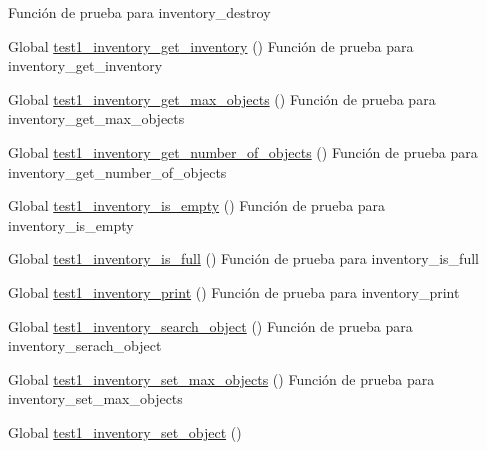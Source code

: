 \begin{DoxyRefList}
%
Función de prueba para inventory\+\_\+destroy  
\item[Global \mbox{\hyperlink{inventory__test_8c_a4fabef11aa72defe00459c078ae42af4}{test1\+\_\+inventory\+\_\+get\+\_\+inventory}} ()]\label{test__test000046}%
%
Función de prueba para inventory\+\_\+get\+\_\+inventory  
\item[Global \mbox{\hyperlink{inventory__test_8c_a17c5d7d6ecb4161696deca0155e13f4f}{test1\+\_\+inventory\+\_\+get\+\_\+max\+\_\+objects}} ()]\label{test__test000070}%
%
Función de prueba para inventory\+\_\+get\+\_\+max\+\_\+objects  
\item[Global \mbox{\hyperlink{inventory__test_8c_a8ae9f8ddebed8f6dfcda767c1715076d}{test1\+\_\+inventory\+\_\+get\+\_\+number\+\_\+of\+\_\+objects}} ()]\label{test__test000044}%
%
Función de prueba para inventory\+\_\+get\+\_\+number\+\_\+of\+\_\+objects  
\item[Global \mbox{\hyperlink{inventory__test_8c_afe8c9730e30b58535afc0481970ab2b1}{test1\+\_\+inventory\+\_\+is\+\_\+empty}} ()]\label{test__test000056}%
%
Función de prueba para inventory\+\_\+is\+\_\+empty  
\item[Global \mbox{\hyperlink{inventory__test_8c_a7eb3ba387e33c42ff45331c9d9aada34}{test1\+\_\+inventory\+\_\+is\+\_\+full}} ()]\label{test__test000059}%
%
Función de prueba para inventory\+\_\+is\+\_\+full  
\item[Global \mbox{\hyperlink{inventory__test_8c_a7229ceb1916b0da955d23598da89d5ea}{test1\+\_\+inventory\+\_\+print}} ()]\label{test__test000048}%
%
Función de prueba para inventory\+\_\+print  
\item[Global \mbox{\hyperlink{inventory__test_8c_a72641d8b12c0f08ec4aa3590517797e4}{test1\+\_\+inventory\+\_\+search\+\_\+object}} ()]\label{test__test000062}%
%
Función de prueba para inventory\+\_\+serach\+\_\+object  
\item[Global \mbox{\hyperlink{inventory__test_8c_aedc895d6409678b2176d822c105c3796}{test1\+\_\+inventory\+\_\+set\+\_\+max\+\_\+objects}} ()]\label{test__test000067}%
%
Función de prueba para inventory\+\_\+set\+\_\+max\+\_\+objects  
\item[Global \mbox{\hyperlink{inventory__test_8c_a68cdc4960d6ba206a27e71f82486ecd5}{test1\+\_\+inventory\+\_\+set\+\_\+object}} ()]\label{test__test000039}%

\end{DoxyRefList}

